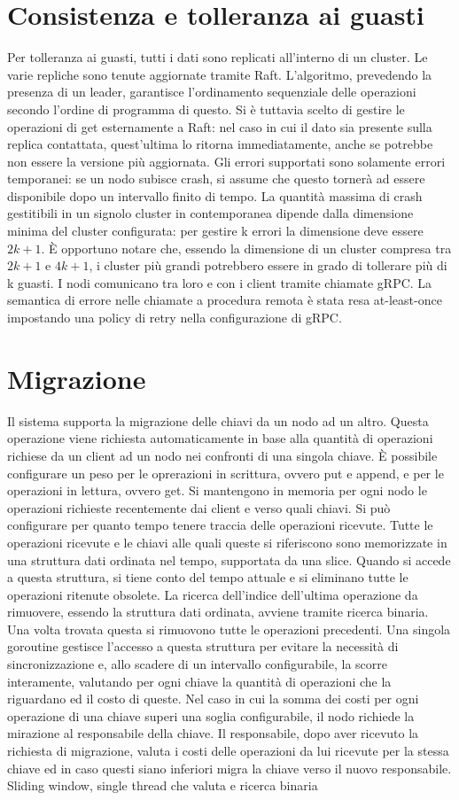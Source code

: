 \documentclass[conference]{IEEEtran}
\begin{document}
\section{Consistenza e tolleranza ai guasti}
Per tolleranza ai guasti, tutti i dati sono replicati all'interno di un cluster. Le varie repliche sono tenute aggiornate
tramite Raft. L'algoritmo, prevedendo la presenza di un leader, garantisce l'ordinamento sequenziale delle operazioni
secondo l'ordine di programma di questo. Si è tuttavia scelto di gestire le operazioni di get esternamente a Raft: nel caso
in cui il dato sia presente sulla replica contattata, quest'ultima lo ritorna immediatamente, anche se potrebbe non essere
la versione più aggiornata. Gli errori supportati sono solamente errori temporanei: se un nodo subisce crash, si assume
che questo tornerà ad essere disponibile dopo un intervallo finito di tempo. La quantità massima di crash gestitibili
in un signolo cluster in contemporanea dipende dalla dimensione minima del cluster configurata: per gestire k errori la
dimensione deve essere \(2k+1\). È opportuno notare che, essendo la dimensione di un cluster compresa tra \(2k+1\) e
\(4k+1\), i cluster più grandi potrebbero essere in grado di tollerare più di k guasti. I nodi comunicano tra loro e con
i client tramite chiamate gRPC. La semantica di errore nelle chiamate a procedura remota è stata resa at-least-once impostando
una policy di retry nella configurazione di gRPC.
\section{Migrazione}
Il sistema supporta la migrazione delle chiavi da un nodo ad un altro. Questa operazione viene richiesta automaticamente
in base alla quantità di operazioni richiese da un client ad un nodo nei confronti di una singola chiave. È possibile configurare
un peso per le oprerazioni in scrittura, ovvero put e append, e per le operazioni in lettura, ovvero get. Si mantengono
in memoria per ogni nodo le operazioni richieste recentemente dai client e verso quali chiavi.
Si può configurare per quanto tempo tenere traccia delle operazioni ricevute. Tutte le operazioni ricevute e le chiavi
alle quali queste si riferiscono sono memorizzate in una struttura dati ordinata nel tempo, supportata da una slice.
Quando si accede a questa struttura, si tiene conto del tempo attuale e si eliminano tutte le operazioni ritenute obsolete.
La ricerca dell'indice dell'ultima operazione da rimuovere, essendo la struttura dati ordinata, avviene tramite ricerca
binaria. Una volta trovata questa si rimuovono tutte le operazioni precedenti. Una singola goroutine gestisce l'accesso a questa
struttura per evitare la necessità di sincronizzazione e, allo scadere di un intervallo configurabile, la scorre interamente,
valutando per ogni chiave la quantità di operazioni che la riguardano ed il costo di queste. Nel caso in cui la somma dei
costi per ogni operazione di una chiave superi una soglia configurabile, il nodo richiede la mirazione al responsabile della chiave.
Il responsabile, dopo aver ricevuto la richiesta di migrazione, valuta i costi delle operazioni da lui ricevute per la stessa
chiave ed in caso questi siano inferiori migra la chiave verso il nuovo responsabile.
Sliding window, single thread che valuta e ricerca binaria
\end{document}
